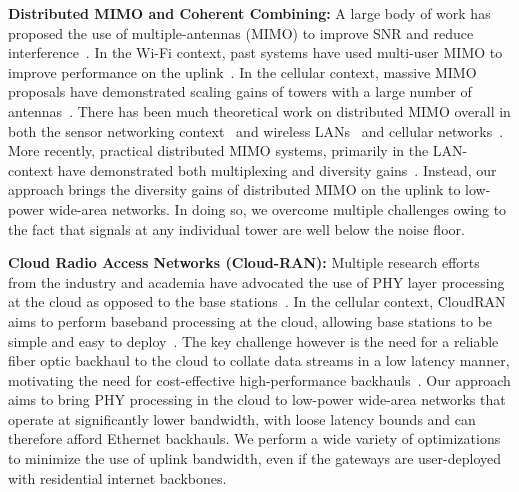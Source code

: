 \noindent \textbf{Distributed MIMO and Coherent Combining: } A large body of work has proposed the use of multiple-antennas (MIMO) to improve SNR and reduce interference~\cite{xie2014scalable, lin2011random, kumar2013bringing}. In the Wi-Fi context, past systems have used multi-user MIMO to improve performance on the uplink~\cite{shen2014rate, tan2009sam, xie2014scalable}. In the cellular context, massive MIMO proposals have demonstrated scaling gains of towers with a large number of antennas~\cite{shepard2012argos, larsson2014massive}. There has been much theoretical work on distributed MIMO overall in both the sensor networking context~\cite{del2007cooperative} and wireless LANs~\cite{dohler2004resource} and cellular networks~\cite{sawahashi2010coordinated}.  More recently, practical distributed MIMO systems, primarily in the LAN-context have demonstrated both multiplexing and diversity gains~\cite{hamed2016real, yenamandra2014vidyut, rahul2012jmb}. Instead, our approach brings the diversity gains of distributed MIMO on the uplink to low-power wide-area networks. In doing so, we overcome multiple challenges owing to the fact that signals at any individual tower are well below the noise floor. \\\vspace*{-0.1in}


\noindent \textbf{Cloud Radio Access Networks (Cloud-RAN): } Multiple research efforts from the industry and academia have advocated the use of PHY layer processing at the cloud as opposed to the base stations~\cite{sabella2013ran, hadzialic2013cloud}. In the cellular context, CloudRAN aims to perform baseband processing at the cloud, allowing base stations to be simple and easy to deploy~\cite{checko2015cloud, wubben2014benefits}. The key challenge however is the need for a reliable fiber optic backhaul to the cloud to collate data streams in a low latency manner, motivating the need for cost-effective high-performance backhauls~\cite{liu2013case, chih2014recent}.  Our approach aims to bring PHY processing in the cloud to low-power wide-area networks that operate at significantly lower bandwidth, with loose latency bounds and can therefore afford Ethernet backhauls. We perform a wide variety of optimizations to minimize the use of uplink bandwidth, even if the gateways are user-deployed with residential internet backbones. 



